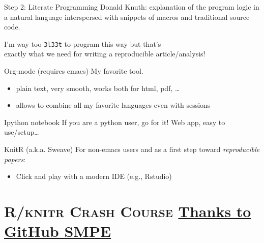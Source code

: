 \documentclass[xcolor=x11names,compress,8pt]{beamer}
\renewcommand{\(}{\begin{columns}}
\renewcommand{\)}{\end{columns}}
\newcommand{\<}[1]{\begin{column}{#1}}
\renewcommand{\>}{\end{column}}
\begin{document}
\begin{frame}[fragile,label=sec-3-2-5]{Step 2: Literate Programming}
 \small
\alert{Donald Knuth}: explanation of the program logic in a \alert{natural language}
\alert{interspersed with snippets of} macros and traditional \alert{source code}.

\begin{center}
I'm way too \texttt{3l33t} to program this way but that's \\
\alert{exactly what we need for writing a reproducible article/analysis!}
\end{center}
\vspace{-.5em}

\begin{block}{Org-mode (requires emacs)}
My favorite tool.
\begin{itemize}
\item plain text, very smooth, works both for html, pdf, \ldots{}
\item allows to combine all my favorite languages even with sessions
\end{itemize}
\end{block}
\begin{block}{Ipython notebook}
If you are a python user, go for it! Web app, easy to use/setup\ldots{}
\end{block}
\begin{block}{KnitR (a.k.a. Sweave)}
For non-emacs users and as a first step toward \emph{reproducible papers}:
\begin{itemize}
\item Click and play with a modern IDE (e.g., Rstudio)
\end{itemize}
\end{block}
\end{frame}
\section[{\scshape R/knitr Crash Course}]{{\scshape R/knitr Crash Course} \href{https://github.com/alegrand/SMPE}{Thanks to GitHub SMPE} }
\label{sec-4}
\end{document}
